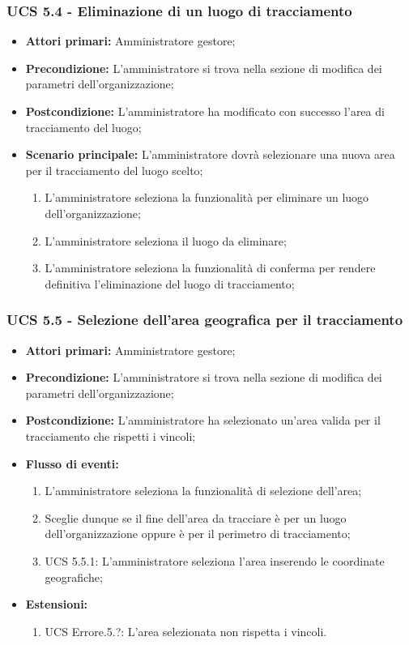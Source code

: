 \subsubsection{UCS 5.4 - Eliminazione di un luogo di tracciamento}%
\begin{itemize}
    \item \textbf{Attori primari:} Amministratore gestore;
    \item \textbf{Precondizione:} L'amministratore si trova nella sezione di modifica dei parametri dell'organizzazione;
    \item \textbf{Postcondizione:} L'amministratore ha modificato con successo l'area di tracciamento del luogo;
    \item \textbf{Scenario principale:} L'amministratore dovrà selezionare una nuova area per il tracciamento del luogo scelto;
    \begin{enumerate}%
        \item L'amministratore seleziona la funzionalità per eliminare un luogo dell'organizzazione;
        \item L'amministratore seleziona il luogo da eliminare;
        \item L'amministratore seleziona la funzionalità di conferma per rendere definitiva l'eliminazione del luogo di tracciamento;
    \end{enumerate}
\end{itemize}

\subsubsection{UCS 5.5 - Selezione dell'area geografica per il tracciamento}%
\begin{itemize}
\item \textbf{Attori primari:} Amministratore gestore;
\item \textbf{Precondizione:} L'amministratore si trova nella sezione di modifica dei parametri dell'organizzazione;
\item \textbf{Postcondizione:} L'amministratore ha selezionato un'area valida per il tracciamento che rispetti i vincoli;
\item \textbf{Flusso di eventi:}
\begin{enumerate}
    \item L'amministratore seleziona la funzionalità di selezione dell'area;
    \item Sceglie dunque se il fine dell'area da tracciare è per un luogo dell'organizzazione oppure è per il perimetro di tracciamento;
    \item UCS 5.5.1: L'amministratore seleziona l'area inserendo le coordinate geografiche;
\end{enumerate}
\item \textbf{Estensioni:}
\begin{enumerate}
    \item UCS Errore.5.?: L'area selezionata non rispetta i vincoli.
\end{enumerate}
\end{itemize}

